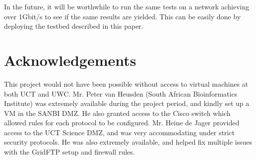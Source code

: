 \documentclass{sig-alternate-05-2015}
\begin{document}
In the future, it will be worthwhile to run the same tests on a network achieving over 1Gbit/s to see if the same results are yielded. This can be easily done by deploying the testbed described in this paper.

\section{Acknowledgements}
This project would not have been possible without access to virtual machines at both UCT and UWC. Mr. Peter van Heusden (South African Bioinformatics Institute) was extremely available during the project period, and kindly set up a VM in the SANBI DMZ. He also granted access to the Cisco switch which allowed rules for each protocol to be configured. Mr. Heine de Jager provided access to the UCT Science DMZ, and was very accommodating under strict security protocols. He was also extremely available, and helped fix multiple issues with the GridFTP setup and firewall rules.
\end{document}

